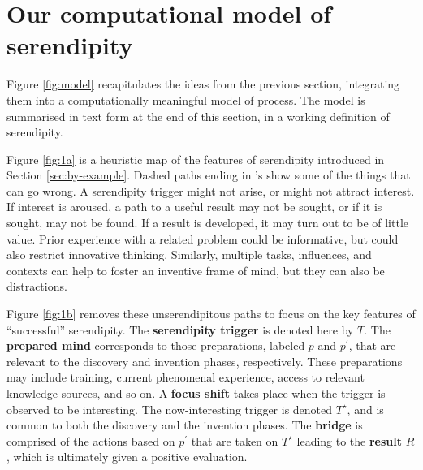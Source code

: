 \section{Our computational model of serendipity} \label{sec:our-model}

Figure \ref{fig:model} recapitulates the ideas from the previous
section, integrating them into a computationally meaningful model of
process.  The model is summarised in text form at the end of this
section, in a working definition of serendipity.

Figure \ref{fig:1a} is a heuristic map of the features of serendipity
introduced in Section \ref{sec:by-example}.
%
Dashed paths ending in \ymark's show some of the things that can go
wrong.  A serendipity trigger might not arise, or might not attract
interest.  If interest is aroused, a path to a useful result may not
be sought, or if it is sought, may not be found.  If a result is
developed, it may turn out to be of little value.  Prior experience
with a related problem could be informative, but could also restrict
innovative thinking.  Similarly, multiple tasks, influences, and
contexts can help to foster an inventive frame of mind, but they can
also be distractions.

Figure \ref{fig:1b} removes these unserendipitous paths to focus on
the key features of ``successful'' serendipity.
%
The \textbf{serendipity trigger} is denoted here by $T$.  
%
The \textbf{prepared mind} corresponds to those preparations, labeled
$p$ and $p^{\prime}$, that are relevant to the discovery and invention
phases, respectively.  These preparations may include training,
current phenomenal experience, access to relevant knowledge sources,
and so on.
%
A \textbf{focus shift} takes place when the trigger is observed to be
interesting.  The now-interesting trigger is denoted $T^\star$, and is
common to both the discovery and the invention phases.
%
%
The \textbf{bridge} is comprised of the actions based on $p^{\prime}$
that are taken on $T^\star$ leading to the \textbf{result} $R$, which is ultimately given a positive evaluation.

